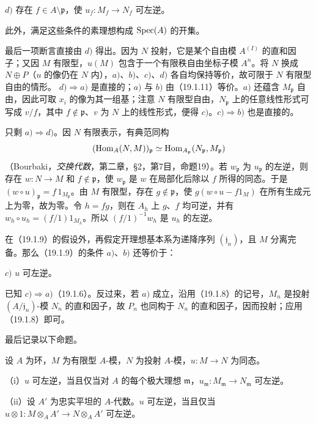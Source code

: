 $d)$ 存在 $f\in A\setminus\mathfrak p$，使 $u_f:M_f\to N_f$ 可左逆。

此外，满足这些条件的素理想构成 $\operatorname{Spec}(A)$ 的开集。

最后一项断言直接由 $d)$ 得出。因为 $N$ 投射，它是某个自由模 $A^{(I)}$ 的直和因子；又因 $M$ 有限型，$u(M)$ 包含于一个有限秩自由坐标子模 $A^n$。将 $N$ 换成 $N\oplus P$（$u$ 的像仍在 $N$ 内），$a)$、$b)$、$c)$、$d)$ 各自均保持等价，故可限于 $N$ 有限型自由的情形。
$d)\Rightarrow a)$ 是直接的；$a)$ 与 $b)$ 由（19.1.11）等价。$a)$ 还蕴含 $M_{\mathfrak p}$ 自由，因此可取 $x_i$ 的像为其一组基；注意 $N$ 有限型自由，$N_{\mathfrak p}$ 上的任意线性形式可写成 $v/f$，其中 $f\notin\mathfrak p$、$v$ 为 $N$ 上的线性形式，便得 $c)$。$c)\Rightarrow b)$ 也是直接的。

只剩 $a)\Rightarrow d)$。因 $N$ 有限表示，有典范同构
\[
 (\operatorname{Hom}_A(N,M))_{\mathfrak p}\simeq
 \operatorname{Hom}_{A_{\mathfrak p}}(N_{\mathfrak p},M_{\mathfrak p})
\]
（Bourbaki，\textit{交换代数}，第二章，§2，第7目，命题19）。若 $w_{\mathfrak p}$ 为 $u_{\mathfrak p}$ 的左逆，则存在 $w:N\to M$ 和 $f\notin\mathfrak p$，使 $w_{\mathfrak p}$ 是 $w$ 在局部化后除以 $f$ 所得的同态。于是 $(w\circ u)_{\mathfrak p}=f\,1_{M_{\mathfrak p}}$。由 $M$ 有限型，存在 $g\notin\mathfrak p$，使 $g(w\circ u-f1_M)$ 在所有生成元上为零，故为零。令 $h=fg$，则在 $A_h$ 上 $g$、$f$ 均可逆，并有 $w_h\circ u_h=(f/1)1_{M_h}$。所以 $(f/1)^{-1}w_h$ 是 $u_h$ 的左逆。

在（19.1.9）的假设外，再假定开理想基本系为递降序列 $(\mathfrak j_n)$，且 $M$ 分离完备。那么（19.1.9）的条件 $a)$、$b)$ 还等价于：

$c)$ $u$ 可左逆。

已知 $c)\Rightarrow a)$（19.1.6）。反过来，若 $a)$ 成立，沿用（19.1.8）的记号，$M_n$ 是投射 $(A/\mathfrak j_n)$-模 $N_n$ 的直和因子，故 $P_n$ 也同构于 $N_n$ 的直和因子，因而投射；应用（19.1.8）即可。

最后记录以下命题。

设 $A$ 为环，$M$ 为有限型 $A$-模，$N$ 为投射 $A$-模，$u:M\to N$ 为同态。

（i）$u$ 可左逆，当且仅当对 $A$ 的每个极大理想 $\mathfrak m$，$u_{\mathfrak m}:M_{\mathfrak m}\to N_{\mathfrak m}$ 可左逆。

（ii）设 $A'$ 为忠实平坦的 $A$-代数。$u$ 可左逆，当且仅当 $u\otimes1:M\otimes_AA'\to N\otimes_AA'$ 可左逆。


